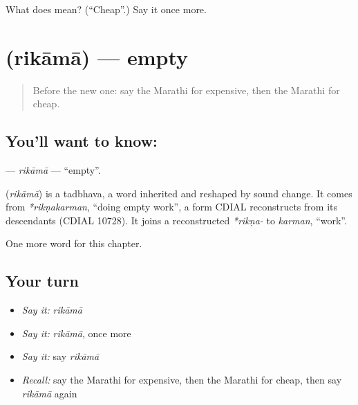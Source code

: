 \begin{tcolorbox}[breakable,colback=teal!4,colframe=teal!35!black,title={Before you move on}]
What does  mean? (\textquotedblleft{}Cheap\textquotedblright{}.) Say it once more.
\end{tcolorbox}
\section[\texorpdfstring{\mr{रिकामा} (rikāmā)}{रिकामा (rikāmā)}]{ (rikāmā) — empty}

\label{lesson:MR-C105-rikama}



\begin{quote}
Before the new one: say the Marathi for expensive, then the Marathi for cheap.
\end{quote}

\subsection*{You'll want to know: }
\textbf{} — \emph{rikāmā} — \textquotedblleft{}empty\textquotedblright{}.

\begin{cousinweb}
\textbf{} (\emph{rikāmā}) is a tadbhava, a word inherited and reshaped by sound change. It comes from \emph{*rikṇakarman}, \textquotedblleft{}doing empty work\textquotedblright{}, a form CDIAL reconstructs from its descendants (CDIAL 10728). It joins a reconstructed \emph{*rikṇa-} to \emph{karman}, \textquotedblleft{}work\textquotedblright{}.
\end{cousinweb}

\begin{grammarlens}[title={What you've built}]
One more word for this chapter.
\end{grammarlens}

\subsection*{Your turn}
\begin{itemize}
\raggedright
  \item \emph{Say it:} \emph{rikāmā}
  \item \emph{Say it:} \emph{rikāmā}, once more
  \item \emph{Say it:} say \emph{rikāmā}
  \item \emph{Recall:} say the Marathi for expensive, then the Marathi for cheap, then say \emph{rikāmā} again
\end{itemize}

